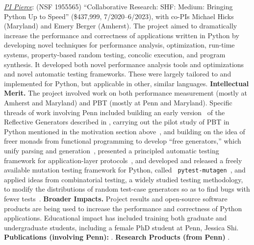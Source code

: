 

\emph{\underline{PI Pierce}}: (NSF 1955565) ``Collaborative Research:
SHF: Medium: Bringing Python Up to Speed'' (\$437,999,
7/2020--6/2023), with co-PIs Michael Hicks (Maryland) and Emery Berger
(Amherst).
The project aimed to dramatically increase the performance and
correctness of applications written in Python by developing novel
techniques for performance analysis, optimization, run-time systems,
property-based random testing, concolic execution, and program
synthesis. It developed both
novel performance analysis tools and optimizations and novel automatic
testing frameworks. These were largely tailored to and implemented for
Python, but applicable in other, similar languages.
%
{\bf Intellectual Merit.} The project involved work on both
performance measurement (mostly at Amherst and Maryland) and PBT (mostly at Penn
and Maryland).  Specific threads of work involving Penn included
building an early
version~\cite{Frohlich2022} of the Reflective Generators described in
, carrying out the pilot study of PBT in Python
mentioned in the motivation section
above~\cite{goldstein_problems_2022}, and building on the idea of
freer monads from functional programming to develop ``free
generators,'' which unify parsing and
generation~\cite{goldstein2022parsing}, presented a principled
automatic testing framework for application-layer
protocols~\cite{Li2021:MBToNA}, and developed and released a freely
available mutation testing framework for Python, called {\tt
  pytest-mutagen}~\cite{pytestmutagen}, and applied ideas from
combinatorial testing, a widely studied testing methodology, to modify
the distributions of random test-case generators so as to find bugs
with fewer tests~\cite{DBLP:conf/esop/GoldsteinHLP21}.
%
{\bf Broader Impacts.} Project results and open-source software
products are being used to increase the
performance and correctness of Python applications.
Educational impact has included training both graduate and
undergraduate students, including a female PhD student at Penn, Jessica
Shi.
%
{\bf Publications (involving Penn):} \cite{Frohlich2022,DBLP:conf/esop/GoldsteinHLP21,
  goldstein2022parsing, goldstein_problems_2022, Li2021:MBToNA}.
{\bf Research Products (from Penn)} \cite{pytestmutagen}.

